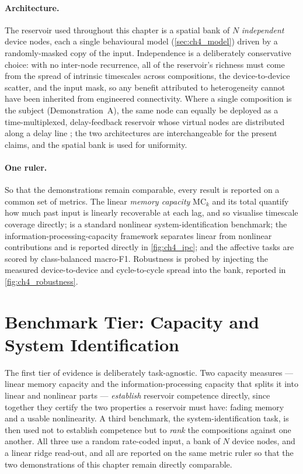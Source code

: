 \documentclass[12pt, twoside]{report}
\begin{document}
\paragraph{Architecture.} The reservoir used throughout this chapter is a spatial bank of $N$ \emph{independent} device nodes, each a single behavioural model (\cref{sec:ch4_model}) driven by a randomly-masked copy of the input. Independence is a deliberately conservative choice: with no inter-node recurrence, all of the reservoir's richness must come from the spread of intrinsic timescales across compositions, the device-to-device scatter, and the input mask, so any benefit attributed to heterogeneity cannot have been inherited from engineered connectivity. Where a single composition is the subject (Demonstration~A), the same node can equally be deployed as a time-multiplexed, delay-feedback reservoir whose virtual nodes are distributed along a delay line \cite{Appeltant2011}; the two architectures are interchangeable for the present claims, and the spatial bank is used for uniformity.

\paragraph{One ruler.} So that the demonstrations remain comparable, every result is reported on a common set of metrics. The linear \emph{memory capacity} $\mathrm{MC}_k$ and its total \cite{Jaeger2002STM} quantify how much past input is linearly recoverable at each lag, and so visualise timescale coverage directly; \NARMA{} \cite{AtiyaParlos2000} is a standard nonlinear system-identification benchmark; the information-processing-capacity framework \cite{Dambre2012} separates linear from nonlinear contributions and is reported directly in \cref{fig:ch4_ipc}; and the affective tasks are scored by class-balanced macro-F1. Robustness is probed by injecting the measured device-to-device and cycle-to-cycle spread into the bank, reported in \cref{fig:ch4_robustness}.

\section{Benchmark Tier: Capacity and System Identification}\label{sec:ch4_benchmarks}

The first tier of evidence is deliberately task-agnostic. Two capacity measures --- linear memory capacity and the information-processing capacity that splits it into linear and nonlinear parts --- \emph{establish} reservoir competence directly, since together they certify the two properties a reservoir must have: fading memory and a usable nonlinearity. A third benchmark, the \NARMA{} system-identification task, is then used not to establish competence but to \emph{rank} the compositions against one another. All three use a random rate-coded input, a bank of $N$ device nodes, and a linear ridge read-out, and all are reported on the same metric ruler so that the two demonstrations of this chapter remain directly comparable.
\end{document}
